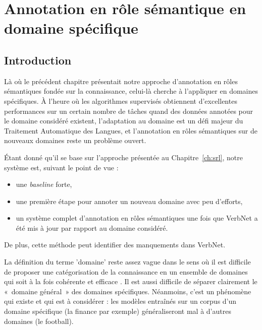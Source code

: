 

\chapter{Annotation en rôle sémantique en domaine spécifique}
\label{ch:domainsrl}

\section{Introduction}

Là où le précédent chapitre présentait notre approche d'annotation en rôles
sémantiques fondée sur la connaissance, celui-là cherche à l'appliquer en
domaines spécifiques. À l'heure où les algorithmes supervisés obtiennent
d'excellentes performances sur un certain nombre de tâches quand des données
annotées pour le domaine considéré existent, l'adaptation au domaine est un
défi majeur du Traitement Automatique des Langues, et l'annotation en rôles
sémantiques sur de nouveaux domaines reste un problème ouvert. 

Étant donné qu'il se base sur l'approche présentée au Chapitre~\ref{ch:srl},
notre système est, suivant le point de vue :
\begin{itemize}
    \item une \emph{baseline} forte,
    \item une première étape pour annoter un nouveau domaine avec peu d'efforts,
    \item un système complet d'annotation en rôles sémantiques une fois que
        VerbNet a été mis à jour par rapport au domaine considéré.
\end{itemize}

De plus, cette méthode peut identifier des manquements dans VerbNet.

La définition du terme 'domaine' reste assez vague dans le sens où il est
difficile de proposer une catégorisation de la connaissance en un ensemble de
domaines qui soit à la fois cohérente et efficace \citep{ma2012rethinking}. Il
est aussi difficile de séparer clairement le «~domaine général~» des domaines
spécifiques. Néanmoins, c'est un phénomène qui existe et qui est à considérer :
les modèles entraînés sur un corpus d'un domaine spécifique (la finance par
exemple) généraliseront mal à d'autres domaines (le football).

